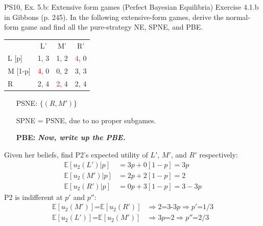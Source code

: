 \begin{frame}{PS10, Ex. 5.b: Extensive form games (Perfect Bayesian Equilibria)}
    Exercise 4.1.b in Gibbons (p. 245). In the following extensive-form games, derive the normal-form game and find all the pure-strategy NE, SPNE, and PBE.
    \vspace{-10pt}
    \begin{multicols}{2}
      \begin{table}
        \begin{tabular}{l|c|c|c|}
          \multicolumn{1}{c}{} & \multicolumn{1}{c}{L'} & \multicolumn{1}{c}{M'} & \multicolumn{1}{c}{R'} \\\cline{2-4}
          L [p]   & 1, \color{blue}3 & 1, 2 & \textcolor{red}{4}, 0 \\\cline{2-4}
          M [1-p] & \textcolor{red}{4}, 0 & 0, 2 & 3, \color{blue}3 \\\cline{2-4}
          R       & 2, \color{blue}4 & \textcolor{red}{2}, \color{blue}4 & 2, \color{blue}4 \\\cline{2-4}
        \end{tabular}
      \end{table} \vspace{-8pt}
      \begin{itemize}
        \item[PSNE:] $\{(R,M')\}$
        \item[SPNE =] PSNE, due to no proper subgames.
        \item[\textbf{PBE:}] \textbf{\textit{Now, write up the PBE.}}
      \end{itemize} \vspace{-6pt}
      Given her beliefs, find P2's expected utility of $L'$, $M'$, and $R'$ respectively: \vspace{-6pt}
      \begin{align*}
        \mathbb{E}[u_2(L')|p]&=3p+0[1-p]=3p\\
        \mathbb{E}[u_2(M')|p]&=2p+2[1-p]=2\\
        \mathbb{E}[u_2(R')|p]&=0p+3[1-p]=3-3p
      \end{align*}
      P2 is indifferent at $p'$ and $p''$: \vspace{-6pt}
      \begin{align*}
        \mathbb{E}[u_2(M')]\text{=}\mathbb{E}[u_2(R')]&\Rightarrow 2\text{=3-3}p\Rightarrow p'\text{=}1/3\\
        \mathbb{E}[u_2(L')]\text{=}\mathbb{E}[u_2(M')]&\Rightarrow 3p\text{=}2\Rightarrow p''\text{=}2/3

\end{align*}
\end{multicols}
\end{frame}

